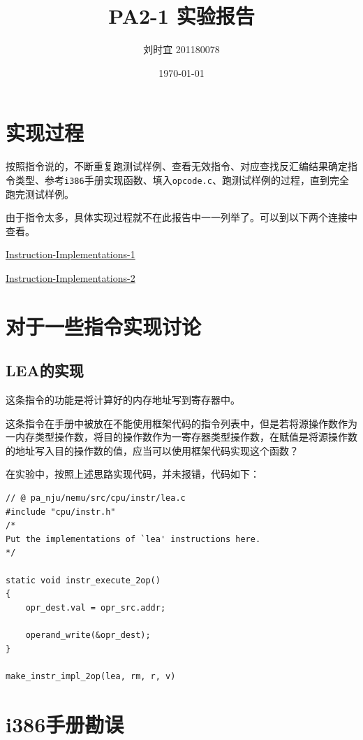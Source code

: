 \documentclass[UTF8]{ctexart}
\title{\textbf{PA2-1 实验报告}}
\author{刘时宜 201180078}
\date{\today}
\begin{document}
\maketitle
\tableofcontents

\section{实现过程}
按照指令说的，不断重复跑测试样例、查看无效指令、对应查找反汇编结果确定指令类型、参考\verb|i386|手册实现函数、填入\verb|opcode.c|、跑测试样例的过程，直到完全跑完测试样例。

由于指令太多，具体实现过程就不在此报告中一一列举了。可以到以下两个连接中查看。

\href{https://andyliu92.notion.site/Instruction-Implementations-1-d3a43e548b98495998ed0eea963e749f}{Instruction-Implementations-1}

\href{https://andyliu92.notion.site/Instruction-Implementations-2-fe446e10733f47d08981711b9dc6f1a2}{Instruction-Implementations-2}

\section{对于一些指令实现讨论}

\subsection{LEA的实现}
这条指令的功能是将计算好的内存地址写到寄存器中。

这条指令在手册中被放在不能使用框架代码的指令列表中，但是若将源操作数作为一内存类型操作数，将目的操作数作为一寄存器类型操作数，在赋值是将源操作数的地址写入目的操作数的值，应当可以使用框架代码实现这个函数？

在实验中，按照上述思路实现代码，并未报错，代码如下：

\lstset{language=C}
\begin{lstlisting}[style=CStyle]
// @ pa_nju/nemu/src/cpu/instr/lea.c
#include "cpu/instr.h"
/*
Put the implementations of `lea' instructions here.
*/

static void instr_execute_2op()
{
    opr_dest.val = opr_src.addr;
    
    operand_write(&opr_dest);
}

make_instr_impl_2op(lea, rm, r, v)
\end{lstlisting}

\section{i386手册勘误}
\end{document}
